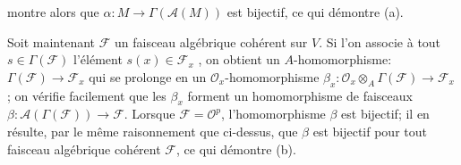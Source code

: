 \begin{center}
\end{center}
montre alors que $\alpha : M \to \Gamma(\mathcal{A}(M))$ est bijectif, ce qui démontre (a).

Soit maintenant $\mathcal{F}$ un faisceau algébrique cohérent sur $V$. Si l'on associe à tout $s \in \Gamma(\mathcal{F})$ l'élément $s(x) \in \mathcal{F}_x$ , on obtient un $A$-homomorphisme: $\Gamma(\mathcal{F}) \to \mathcal{F}_x$ qui se prolonge en un $\mathcal{O}_x$-homomorphisme $\beta_x : \mathcal{O}_x \otimes_A \Gamma(\mathcal{F}) \to \mathcal{F}_x$ ; on vérifie facilement que les $\beta_x$ forment un homomorphisme de faisceaux $\beta : \mathcal{A}(\Gamma(\mathcal{F})) \to \mathcal{F}$. Lorsque $\mathcal{F} = \mathcal{O}^p$, l'homomorphisme $\beta$ est bijectif; il en résulte, par le même raisonnement que ci-dessus, que $\beta$ est bijectif pour tout faisceau algébrique cohérent $\mathcal{F}$, ce qui démontre (b).

